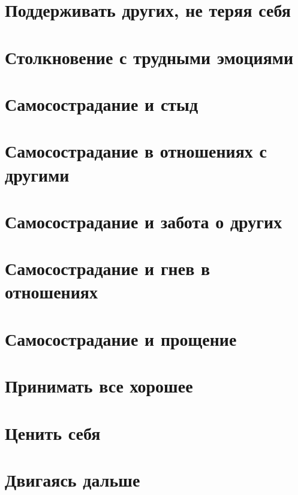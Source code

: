 \documentclass[a4paper,12pt]{report}
\begin{document}
\chapter{Поддерживать других, не теряя себя}
\chapter{Столкновение с трудными эмоциями}
\chapter{Самосострадание и стыд}
\chapter{Самосострадание в отношениях с другими}
\chapter{Самосострадание и забота о других}
\chapter{Самосострадание и гнев в отношениях}
\chapter{Самосострадание и прощение}
\chapter{Принимать все хорошее}
\chapter{Ценить себя}
\chapter{Двигаясь дальше}
\end{document}
